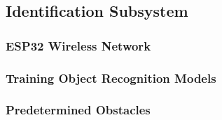 \subsection{Identification Subsystem}

\subsubsection{ESP32 Wireless Network}

\subsubsection{Training Object Recognition Models}

\subsubsection{Predetermined Obstacles}
